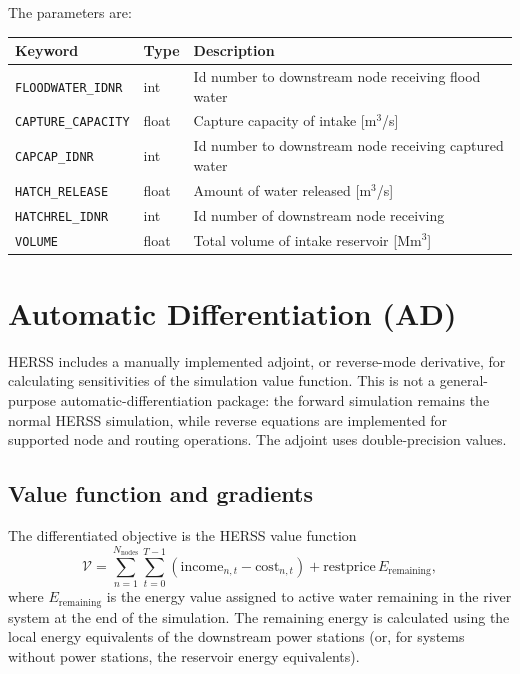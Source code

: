 \documentclass[a4paper, 12pt]{report}
\begin{document}
   
	\noindent The parameters are:
	\begin{center}
		\begin{tabular}{lll}
			\hline
			Keyword & Type & Description \\
			\hline
			\texttt{FLOODWATER\_IDNR }   & int   & Id number to downstream node receiving flood water \\
			\texttt{CAPTURE\_CAPACITY}   & float & Capture capacity of intake  [m$^3$/s]\\
			\texttt{CAPCAP\_IDNR}        & int   & Id number to downstream node receiving captured water \\
			\texttt{HATCH\_RELEASE}      & float & Amount of water released  [m$^3$/s] \\
			\texttt{HATCHREL\_IDNR}      & int   & Id number of downstream node receiving \\
			\texttt{VOLUME}              & float & Total volume of intake reservoir [Mm$^3$] \\
			\hline
		\end{tabular}
	\end{center}

   
    \newpage
    

\section{Automatic Differentiation (AD)}
\label{sec:automatic-differentiation}

HERSS includes a manually implemented adjoint, or reverse-mode derivative,
for calculating sensitivities of the simulation value function. This is not a
general-purpose automatic-differentiation package: the forward simulation
remains the normal HERSS simulation, while reverse equations are implemented
for supported node and routing operations. The adjoint uses double-precision
values.

\subsection{Value function and gradients}

The differentiated objective is the HERSS value function
\begin{equation}
	\mathcal{V}
	=
	\sum_{n=1}^{N_{\mathrm{nodes}}}
	\sum_{t=0}^{T-1}
	\left(\mathrm{income}_{n,t}-\mathrm{cost}_{n,t}\right)
	+ \mathrm{restprice}\, E_{\mathrm{remaining}},
\end{equation}
where $E_{\mathrm{remaining}}$ is the energy value assigned to active water
remaining in the river system at the end of the simulation. The remaining
energy is calculated using the local energy equivalents of the downstream
power stations (or, for systems without power stations, the reservoir energy
equivalents).
\end{document}
